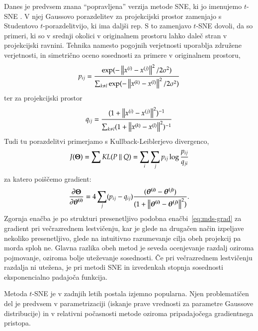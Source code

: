 Danes je predvsem znana ``popravljena'' verzija metode SNE, ki jo imenujemo $t$-SNE . V njej Gaussovo porazdelitev za projekcijski prostor zamenjajo s Studentovo $t$-porazdelitvijo, ki ima daljši rep. S to zamenjavo $t$-SNE dovoli, da so primeri, ki so v srednji okolici v originalnem prostoru lahko daleč stran v projekcijski ravnini. Tehnika namesto pogojnih verjetnosti uporablja združene verjetnosti, in simetrično oceno sosednosti za primere v originalnem prostoru,
%
\begin{equation}
  \nonumber
  p_{ij}=\frac{\exp(-\left\lVert x^{(i)}-x^{(j)}\right\rVert^2/2\sigma^2)}
  {\sum_{k\neq l}\exp(-\left\lVert x^{(k)}-x^{(l)}\right\rVert^2/2\sigma^2)}
\end{equation}
%
ter za projekcijski prostor
\begin{equation}
  \nonumber
  q_{ij}=\frac{(1+\left\lVert x^{(i)}-x^{(j)}\right\rVert^2)^{-1}}
  {\sum_{k\neq l}(1+\left\lVert x^{(k)}-x^{(l)}\right\rVert^2)^{-1}}
\end{equation}
%
Tudi tu porazdelitvi primerjamo s Kullback-Leiblerjevo divergenco,
\begin{equation}
  \nonumber
  J(\boldsymbol{\Theta}) = \sum KL(P\ ||\ Q)=\sum_i\sum_j p_{ij}\log\frac{p_{ij}}{q_{ji}}
\end{equation}
za katero poiščemo gradient:
%
\begin{equation}
  \nonumber
  \frac{\partial\boldsymbol{\Theta}}{\partial\boldsymbol{\theta^{(i)}}} = 4\sum_j(p_{ij}-q_{ij})
\frac{(\boldsymbol{\theta^{(i)}}-\boldsymbol{\theta^{(j)}})}{(1+\left\lVert\boldsymbol{\theta^{(i)}}-\boldsymbol{\theta^{(j)}}\right\rVert^2)}.
\end{equation}
Zgornja enačba je po strukturi presenetljivo podobna enačbi~\ref{eq:mds-grad}  za gradient pri večrazrednem lestvičenju, kar je glede na drugačen način izpeljave nekoliko presenetljivo, glede na intuitivno razumevanje cilja obeh projekcij pa morda sploh ne. Glavna razlika obeh metod je seveda ocenjevanje razdalj oziroma pojmovanje, oziroma bolje uteževanje sosednosti. Če pri večrazrednem lestvičenju razdalja ni utežena, je pri metodi SNE in izvedenkah stopnja sosednosti eksponencialno padajoča funkcija.

Metoda $t$-SNE je v zadnjih letih postala izjemno popularna. Njen problematičen del je predvsem v parametrizaciji (iskanje prave vrednosti za parametre Gaussove distribucije) in v relativni počasnosti metode oziroma pripadajočega gradientnega pristopa.
